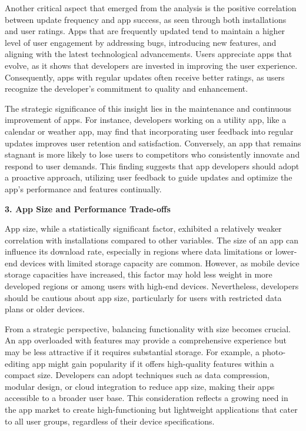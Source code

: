 \documentclass[
]{article}
\begin{document}
Another critical aspect that emerged from the analysis is the positive
correlation between update frequency and app success, as seen through
both installations and user ratings. Apps that are frequently updated
tend to maintain a higher level of user engagement by addressing bugs,
introducing new features, and aligning with the latest technological
advancements. Users appreciate apps that evolve, as it shows that
developers are invested in improving the user experience. Consequently,
apps with regular updates often receive better ratings, as users
recognize the developer's commitment to quality and enhancement.

The strategic significance of this insight lies in the maintenance and
continuous improvement of apps. For instance, developers working on a
utility app, like a calendar or weather app, may find that incorporating
user feedback into regular updates improves user retention and
satisfaction. Conversely, an app that remains stagnant is more likely to
lose users to competitors who consistently innovate and respond to user
demands. This finding suggests that app developers should adopt a
proactive approach, utilizing user feedback to guide updates and
optimize the app's performance and features continually.

\textbf{3. App Size and Performance Trade-offs}

App size, while a statistically significant factor, exhibited a
relatively weaker correlation with installations compared to other
variables. The size of an app can influence its download rate,
especially in regions where data limitations or lower-end devices with
limited storage capacity are common. However, as mobile device storage
capacities have increased, this factor may hold less weight in more
developed regions or among users with high-end devices. Nevertheless,
developers should be cautious about app size, particularly for users
with restricted data plans or older devices.

From a strategic perspective, balancing functionality with size becomes
crucial. An app overloaded with features may provide a comprehensive
experience but may be less attractive if it requires substantial
storage. For example, a photo-editing app might gain popularity if it
offers high-quality features within a compact size. Developers can adopt
techniques such as data compression, modular design, or cloud
integration to reduce app size, making their apps accessible to a
broader user base. This consideration reflects a growing need in the app
market to create high-functioning but lightweight applications that
cater to all user groups, regardless of their device specifications.
\end{document}
